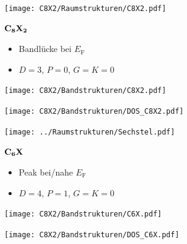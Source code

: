 \documentclass{beamer}
\newcommand \inlinetitle[1]{\begin{center} \color{MidnightBlue} \bf \Large #1 \end{center}}
\begin{document}
	\begin{frame}
		\begin{minipage}[b][0.48\textwidth][c]{0.48\textwidth}
			\texttt{[image: C8X2/Raumstrukturen/C8X2.pdf]}
		\end{minipage}
		\hfill
		\begin{minipage}[b][0.48\textwidth][c]{0.48\textwidth}
			\inlinetitle{$\bf C_{\boldsymbol 8}X_{\boldsymbol 2}$}
			\begin{itemize}
				\item Bandlücke bei $E_\text{F}$
				\item $D = 3$, $P = 0$, $G = K = 0$
			\end{itemize}
		\end{minipage}
		\begin{minipage}{0.48\textwidth}
			\texttt{[image: C8X2/Bandstrukturen/C8X2.pdf]}
		\end{minipage}
		\hfill
		\begin{minipage}{0.48\textwidth}
			\texttt{[image: C8X2/Bandstrukturen/DOS\_C8X2.pdf]}
		\end{minipage}
	\end{frame}
	
	\begin{frame}
		\begin{minipage}[b][0.48\textwidth][c]{0.48\textwidth}
			\texttt{[image: ../Raumstrukturen/Sechstel.pdf]}
		\end{minipage}
		\hfill
		\begin{minipage}[b][0.48\textwidth][c]{0.48\textwidth}
			\inlinetitle{$\bf C_{\boldsymbol 6}X$}
			\begin{itemize}
				\item Peak bei/nahe $E_\text{F}$
				\item $D = 4$, $P = 1$, $G = K = 0$
			\end{itemize}
		\end{minipage}
		\begin{minipage}{0.48\textwidth}
			\texttt{[image: C8X2/Bandstrukturen/C6X.pdf]}
		\end{minipage}
		\hfill
		\begin{minipage}{0.48\textwidth}
			\texttt{[image: C8X2/Bandstrukturen/DOS\_C6X.pdf]}
		\end{minipage}
	\end{frame}
	
\end{document}
